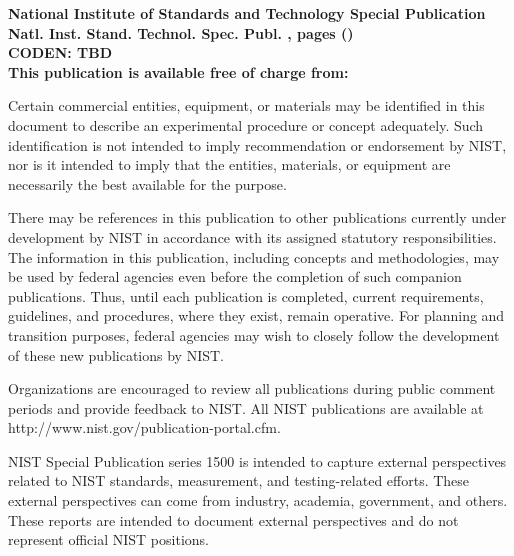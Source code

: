 \begin{titlepage}
\footnotesize  

\begin{flushright}
\normalsize \textbf{National Institute of Standards and Technology Special Publication \pubnumber\\ 
Natl. Inst. Stand. Technol. Spec. Publ. \pubnumber, \pageref{LastPage} pages (\monthyear)} \\
\textbf{CODEN: TBD}\\
\vspace{12pt}
\textbf{This publication is available free of charge from: \DOI}

\end{flushright}

Certain commercial entities, equipment, or materials may be identified in this document to describe an experimental procedure or concept adequately. Such identification is not intended to imply recommendation or endorsement by NIST, nor is it intended to imply that the entities, materials, or equipment are necessarily the best available for the purpose. 

There may be references in this publication to other publications currently under development by NIST in accordance with its assigned statutory responsibilities. The information in this publication, including concepts and methodologies, may be used by federal agencies even before the completion of such companion publications. Thus, until each publication is completed, current requirements, guidelines, and procedures, where they exist, remain operative. For planning and transition purposes, federal agencies may wish to closely follow the development of these new publications by NIST. 

Organizations are encouraged to review all publications during public comment periods and provide feedback to NIST. All NIST publications are available at http://www.nist.gov/publication-portal.cfm.



\vspace{12pt}
\vspace{12pt}
NIST Special Publication series 1500 is intended to capture external perspectives related to NIST standards, measurement, and testing-related efforts. These external perspectives can come from industry, academia, government, and others. These reports are intended to document external perspectives and do not represent official NIST positions.


\end{titlepage}
